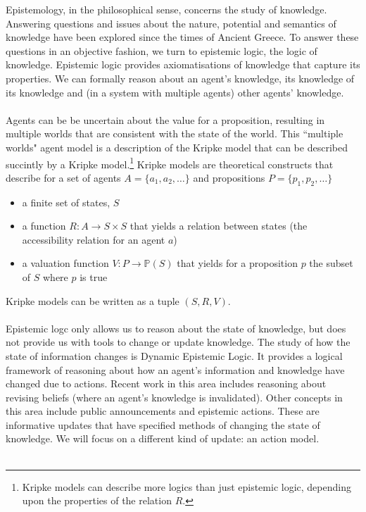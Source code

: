 Epistemology, in the philosophical sense, concerns the study of knowledge.
Answering questions and issues about the nature, potential and semantics of knowledge have been explored since the times of Ancient Greece.
To answer these questions in an objective fashion, we turn to epistemic logic, the logic of knowledge.
Epistemic logic provides axiomatisations of knowledge that capture its properties.
We can formally reason about an agent's knowledge, its knowledge of its knowledge and (in a system with multiple agents) other agents' knowledge. \cite{van2008dynamic}\\
\\
Agents can be be uncertain about the value for a proposition, resulting in multiple worlds that are consistent with the state of the world.
This ``multiple worlds" agent model is a description of the Kripke model that can be described succintly by a Kripke model.\footnote{Kripke models can describe more logics than just epistemic logic, depending upon the properties of the relation $R$.}
Kripke models are theoretical constructs that describe for a set of agents $A = \{a_1, a_2, \ldots\}$ and propositions $P = \{p_1, p_2, \ldots \}$
\begin{itemize}
  \item a finite set of states, $S$
  \item a function $R: A \to S \times S$ that yields a relation between states (the accessibility relation for an agent $a$)
  \item a valuation function $V: P \to \mathbb{P}(S)$ that yields for a proposition $p$ the subset of $S$ where $p$ is true
\end{itemize}
Kripke models can be written as a tuple $(S, R, V)$.\\
\\
Epistemic logc only allows us to reason about the state of knowledge, but does not provide us with tools to change or update knowledge.
The study of how the state of information changes is Dynamic Epistemic Logic.
It provides a logical framework of reasoning about how an agent's information and knowledge have changed due to actions.
Recent work in this area includes reasoning about revising beliefs (where an agent's knowledge is invalidated).
Other concepts in this area include public announcements and epistemic actions.
These are informative updates that have specified methods of changing the state of knowledge.
We will focus on a different kind of update: an action model.\\
\\
